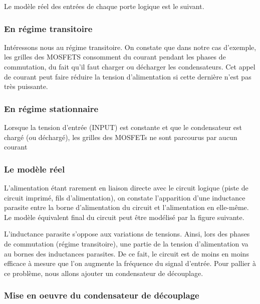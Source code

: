 Le modèle réel des entrées de chaque porte logique est le suivant.



\subsubsection{En régime transitoire}
Intéressons nous au régime transitoire. \n
On constate que dans notre cas d'exemple, les grilles des  MOSFETS consomment du courant pendant les phases de commutation, du fait qu'il faut charger ou décharger les condensateurs.
Cet appel de courant peut faire réduire la tension d'alimentation si cette dernière n'est pas très puissante.


\subsubsection{En régime stationnaire}

Lorsque la tension d'entrée (INPUT) est constante et que le condensateur est chargé (ou déchargé), les grilles des MOSFETs ne sont parcourus par aucun courant \n

\subsubsection{Le modèle réel}

L'alimentation étant rarement en liaison directe avec le circuit logique (piste de circuit imprimé, fils d'alimentation), on constate l'apparition d'une inductance parasite entre la borne d'alimentation du circuit et l'alimentation en elle-même.
Le modèle équivalent final du circuit peut être modélisé par la figure suivante.


L'inductance parasite s'oppose aux variations de tensions. \n Ainsi, lors des phases de commutation (régime transitoire), une partie de la tension d'alimentation va au bornes des inductances parasites.
De ce fait, le circuit est de moins en moins efficace à mesure que l'on augmente la fréquence du signal d'entrée.
Pour pallier à ce problème, nous allons ajouter un condensateur de découplage.
\subsubsection{Mise en oeuvre du condensateur de découplage}


